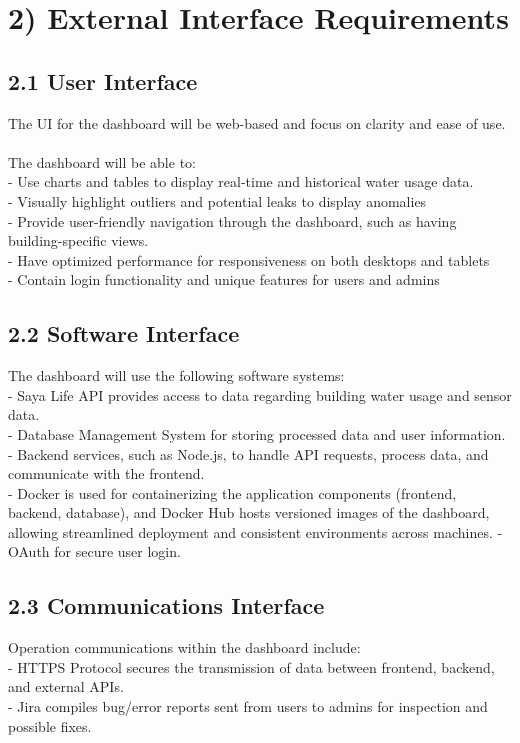 \documentclass[10pt]{article}
\begin{document}
\section*{2) External Interface Requirements}

\subsection*{2.1 User Interface}
The UI for the dashboard will be web-based and focus on clarity and ease of use.\\\\
The dashboard will be able to:\\
- Use charts and tables to display real-time and historical water usage data.\\
- Visually highlight outliers and potential leaks to display anomalies\\
- Provide user-friendly navigation through the dashboard, such as having building-specific views.\\
- Have optimized performance for responsiveness on both desktops and tablets\\
- Contain login functionality and unique features for users and admins

\subsection*{2.2 Software Interface}
The dashboard will use the following software systems:\\
- Saya Life API provides access to data regarding building water usage and sensor data.\\
- Database Management System for storing processed data and user information.\\
- Backend services, such as Node.js, to handle API requests, process data, and communicate with the frontend.\\
- Docker is used for containerizing the application components (frontend, backend, database), and Docker Hub hosts versioned images of the dashboard, allowing streamlined deployment and consistent environments across machines.
- OAuth for secure user login.

\subsection*{2.3 Communications Interface}
Operation communications within the dashboard include:\\
- HTTPS Protocol secures the transmission of data between frontend, backend, and external APIs.\\
- Jira compiles bug/error reports sent from users to admins for inspection and possible fixes.
\end{document}
